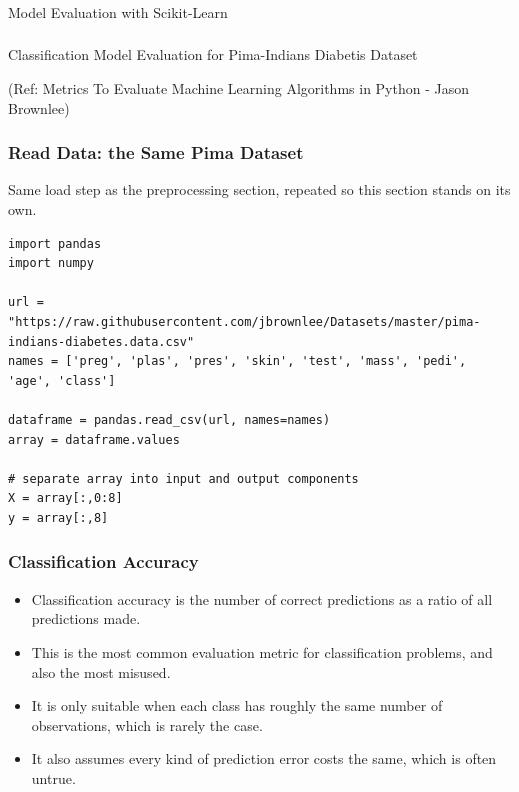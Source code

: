 \begin{frame}[fragile]\frametitle{}
\begin{center}
{\Large Model Evaluation with Scikit-Learn}
\end{center}
\end{frame}

\begin{frame}[fragile]\frametitle{}
\begin{center}
{\Large Classification Model Evaluation for Pima-Indians Diabetis Dataset}

{\tiny (Ref: Metrics To Evaluate Machine Learning Algorithms in Python - Jason Brownlee)}
\end{center}
\end{frame}

\begin{frame}[fragile]\frametitle{Read Data: the Same Pima Dataset}
Same load step as the preprocessing section, repeated so this section stands on its own.
\begin{lstlisting}
import pandas
import numpy

url = "https://raw.githubusercontent.com/jbrownlee/Datasets/master/pima-indians-diabetes.data.csv"
names = ['preg', 'plas', 'pres', 'skin', 'test', 'mass', 'pedi', 'age', 'class']

dataframe = pandas.read_csv(url, names=names)
array = dataframe.values

# separate array into input and output components
X = array[:,0:8]
y = array[:,8]
\end{lstlisting}
\end{frame}

\begin{frame}[fragile]\frametitle{Classification Accuracy}

	\begin{itemize}
	\item Classification accuracy is the number of correct predictions as a ratio of all predictions made.
	\item This is the most common evaluation metric for classification problems, and also the most misused.
	\item It is only suitable when each class has roughly the same number of observations, which is rarely the case.
	\item It also assumes every kind of prediction error costs the same, which is often untrue.
	\end{itemize}

\end{frame}

